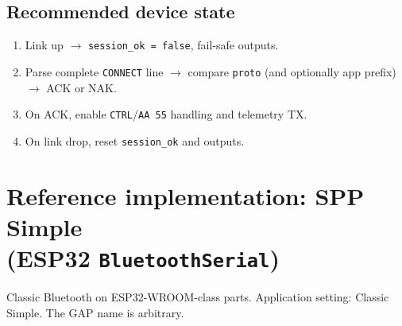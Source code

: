 \documentclass[12pt,a4paper]{article}
\begin{document}
\subsection{Recommended device state}

\begin{enumerate}[leftmargin=1.6cm]
  \item Link up $\rightarrow$ \texttt{session\_ok = false}, fail-safe outputs.
  \item Parse complete \texttt{CONNECT} line $\rightarrow$ compare
        \texttt{proto} (and optionally app prefix) $\rightarrow$ ACK or NAK.
  \item On ACK, enable \texttt{CTRL}/\texttt{AA 55} handling and telemetry TX.
  \item On link drop, reset \texttt{session\_ok} and outputs.
\end{enumerate}

\section{\texorpdfstring{Reference implementation: SPP Simple\\[0.15em](ESP32 \texttt{BluetoothSerial})}{Reference implementation: SPP Simple (ESP32 BluetoothSerial)}}
\label{sec:code-esp32}

Classic Bluetooth on ESP32-WROOM-class parts.
Application setting: Classic Simple.
The GAP name is arbitrary.
\end{document}

